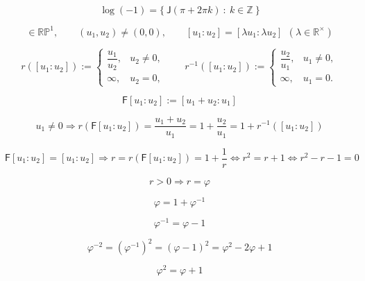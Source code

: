 \documentclass[12pt]{article}
\begin{document}
\begin{equation}
\log(-1)=\bigl\{\ \mathsf{J}(\pi+2\pi k)\ :\ k\in\mathbb{Z}\ \bigr\}
\end{equation}

\begin{equation}
[u_1:u_2]\in\mathbb{RP}^1,
\qquad
(u_1,u_2)\neq(0,0),
\qquad
[u_1:u_2]=[\lambda u_1:\lambda u_2]\ \ (\lambda\in\mathbb{R}^{\times})
\end{equation}

\begin{equation}
r([u_1:u_2]):=
\begin{cases}
\dfrac{u_1}{u_2},&u_2\neq 0,\\[6pt]
\infty,&u_2=0,
\end{cases}
\qquad
r^{-1}([u_1:u_2]):=
\begin{cases}
\dfrac{u_2}{u_1},&u_1\neq 0,\\[6pt]
\infty,&u_1=0.
\end{cases}
\end{equation}

\begin{equation}
\mathsf{F}[u_1:u_2]:=[u_1+u_2:u_1]
\end{equation}

\begin{equation}
u_1\neq 0
\Longrightarrow
r(\mathsf{F}[u_1:u_2])
=
\frac{u_1+u_2}{u_1}
=
1+\frac{u_2}{u_1}
=
1+r^{-1}([u_1:u_2])
\end{equation}

\begin{equation}
\mathsf{F}[u_1:u_2]=[u_1:u_2]
\Longrightarrow
r=r(\mathsf{F}[u_1:u_2])=1+\frac{1}{r}
\Longleftrightarrow
r^2=r+1
\Longleftrightarrow
r^2-r-1=0
\end{equation}

\begin{equation}
r>0\Longrightarrow r=\varphi
\end{equation}

\begin{equation}
\varphi=1+\varphi^{-1}
\end{equation}

\begin{equation}
\varphi^{-1}=\varphi-1
\end{equation}

\begin{equation}
\varphi^{-2}=(\varphi^{-1})^2=(\varphi-1)^2=\varphi^2-2\varphi+1
\end{equation}

\begin{equation}
\varphi^2=\varphi+1
\end{equation}
\end{document}
